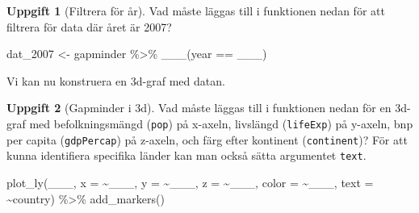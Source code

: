 \documentclass[
]{book}
\newenvironment{Shaded}{\begin{snugshade}}{\end{snugshade}}
\newcommand{\AttributeTok}[1]{\textcolor[rgb]{0.77,0.63,0.00}{#1}}
\newcommand{\FunctionTok}[1]{\textcolor[rgb]{0.00,0.00,0.00}{#1}}
\newcommand{\NormalTok}[1]{#1}
\newcommand{\OtherTok}[1]{\textcolor[rgb]{0.56,0.35,0.01}{#1}}
\newcommand{\SpecialCharTok}[1]{\textcolor[rgb]{0.00,0.00,0.00}{#1}}
\theoremstyle{definition}
\theoremstyle{definition}
\theoremstyle{definition}
\newtheorem{exercise}{Uppgift}[chapter]
\theoremstyle{definition}
\theoremstyle{remark}
\begin{document}
\begin{exercise}[Filtrera för år]

Vad måste läggas till i funktionen nedan för att filtrera för data där året är 2007?

\begin{Shaded}
\begin{Highlighting}[]
\NormalTok{dat\_2007 }\OtherTok{\textless{}{-}}\NormalTok{ gapminder }\SpecialCharTok{\%\textgreater{}\%} 
  \FunctionTok{\_\_\_}\NormalTok{(year }\SpecialCharTok{==}\NormalTok{ \_\_\_)}
\end{Highlighting}
\end{Shaded}

\end{exercise}

Vi kan nu konstruera en 3d-graf med datan.

\begin{exercise}[Gapminder i 3d]

Vad måste läggas till i funktionen nedan för en 3d-graf med befolkningsmängd (\texttt{pop}) på x-axeln, livslängd (\texttt{lifeExp}) på y-axeln, bnp per capita (\texttt{gdpPercap}) på z-axeln, och färg efter kontinent (\texttt{continent})? För att kunna identifiera specifika länder kan man också sätta argumentet \texttt{text}.

\begin{Shaded}
\begin{Highlighting}[]
\FunctionTok{plot\_ly}\NormalTok{(\_\_\_, }\AttributeTok{x =} \SpecialCharTok{\textasciitilde{}}\NormalTok{\_\_\_, }\AttributeTok{y =} \SpecialCharTok{\textasciitilde{}}\NormalTok{\_\_\_, }\AttributeTok{z =} \SpecialCharTok{\textasciitilde{}}\NormalTok{\_\_\_, }\AttributeTok{color =} \SpecialCharTok{\textasciitilde{}}\NormalTok{\_\_\_, }\AttributeTok{text =} \SpecialCharTok{\textasciitilde{}}\NormalTok{country) }\SpecialCharTok{\%\textgreater{}\%} 
  \FunctionTok{add\_markers}\NormalTok{()}
\end{Highlighting}
\end{Shaded}

\end{exercise}
\end{document}
